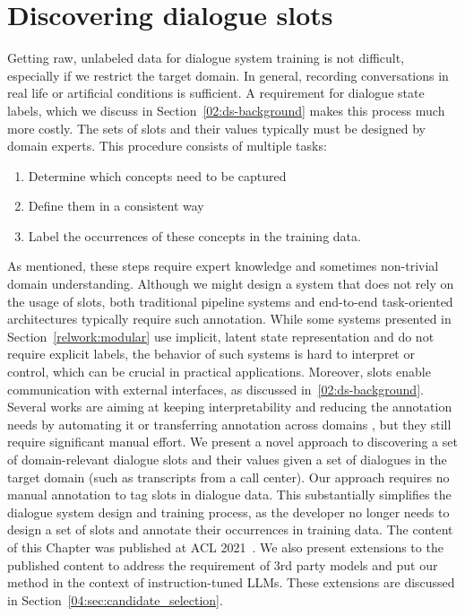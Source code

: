 \chapter{Discovering dialogue slots}%
\label{chap:data_analysis}
Getting raw, unlabeled data for dialogue system training is not difficult, especially if we restrict the target domain.
In general, recording conversations in real life or artificial conditions is sufficient.
A requirement for dialogue state labels, which we discuss in Section~\ref{02:ds-background} makes this process much more costly.
The sets of slots and their values typically must be designed by domain experts.
This procedure consists of multiple tasks:
\begin{enumerate}
    \item Determine which concepts need to be captured
    \item Define them in a consistent way
    \item Label the occurrences of these concepts in the training data.
\end{enumerate}
As mentioned, these steps require expert knowledge and sometimes non-trivial domain understanding.
Although we might design a system that does not rely on the usage of slots, both traditional pipeline systems \cite{young_pomdp-based_2013} and end-to-end task-oriented architectures \cite{wen2016network} typically require such annotation.
While some systems presented in Section~\ref{relwork:modular} use implicit, latent state representation and do not require explicit labels, the behavior of such systems is hard to interpret or control, which can be crucial in practical applications.
Moreover, slots enable communication with external interfaces, as discussed in~\ref{02:ds-background}.
Several works are aiming at keeping interpretability and reducing the annotation needs by automating it \citep{chen2014leveraging,chen2015jointly} or transferring annotation across domains \cite{zhao_zero-shot_2018,coope_span-convert_2020}, but they still require significant manual effort.
We present a novel approach to discovering a set of domain-relevant dialogue slots and their values given a set of dialogues in the target domain (such as transcripts from a call center).
Our approach requires no manual annotation to tag slots in dialogue data.
This substantially simplifies the dialogue system design and training process, as the developer no longer needs to design a set of slots and annotate their occurrences in training data.
The content of this Chapter was published at ACL 2021~\cite{hudecek-etal-2021-discovering}.
We also present extensions to the published content to address the requirement of 3rd party models and put our method in the context of instruction-tuned LLMs.
These extensions are discussed in Section~\ref{04:sec:candidate_selection}.

